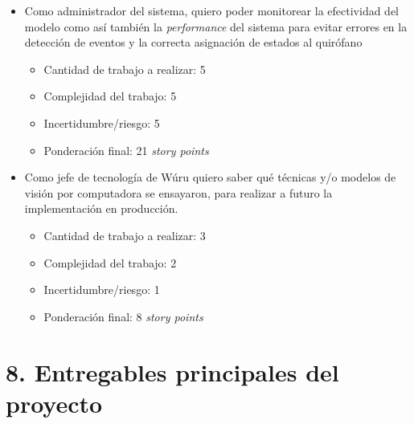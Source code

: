 \documentclass[
11pt, %
]{charter}
\begin{document}
\begin{itemize}
	\item Como administrador del sistema, quiero poder monitorear la efectividad del modelo como así también la \textit{performance} del sistema para evitar errores en la detección de eventos y la correcta asignación de estados al quirófano
	\begin{itemize}
		\item Cantidad de trabajo a realizar: 5
		\item Complejidad del trabajo: 5
		\item Incertidumbre/riesgo: 5
		\item Ponderación final: 21 \textit{story points}
	\end{itemize}
\end{itemize}

\begin{itemize}
	\item Como jefe de tecnología de Wúru quiero saber qué técnicas y/o modelos
	de visión por computadora se ensayaron, para realizar a futuro la implementación en
	producción.
	\begin{itemize}
		\item Cantidad de trabajo a realizar: 3
		\item Complejidad del trabajo: 2
		\item Incertidumbre/riesgo: 1
		\item Ponderación final: 8 \textit{story points}
	\end{itemize}
\end{itemize}


\section{8. Entregables principales del proyecto}
\label{sec:entregables}
\end{document}
